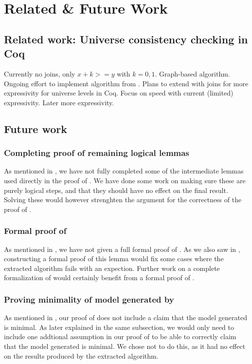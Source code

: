 \chapter{Related \& Future Work}

\section{Related work: Universe consistency checking in Coq}

Currently no joins, only $x + k >= y$ with $k = 0,1$.
Graph-based algorithm. Ongoing effort \cite{coqgithub} to implement algorithm from \cite{mbezem}.
Plans to extend with joins for more expressivity for universe levels in Coq.
Focus on speed with current (limited) expressivity. Later more expressivity.

\section{Future work}

\subsection{Completing proof of remaining logical lemmas}

As mentioned in , we have not fully completed
some of the intermediate lemmas used directly in the proof of .
We have done some work on making sure these are purely logical steps,
and that they should have no effect on the final result.
Solving these would however strenghten the argument for the correctness of the proof of .

\subsection{Formal proof of }

As mentioned in , we have not given a full formal proof
of . As we also saw in , constructing a formal proof of this lemma
would fix some cases where the extracted algorithm fails with an expection.
Further work on a complete formalization of  would certainly benefit from a formal proof of .

\subsection{Proving minimality of model generated by }

As mentioned in , our proof of  does not include a claim that the model
generated is minimal. As later explained in the same subsection, we would only need to include one addtional
assumption in our proof of  to be able to correctly claim that the model generated is minimal.
We chose not to do this, as it had no effect on the results produced by the extracted algorithm.
